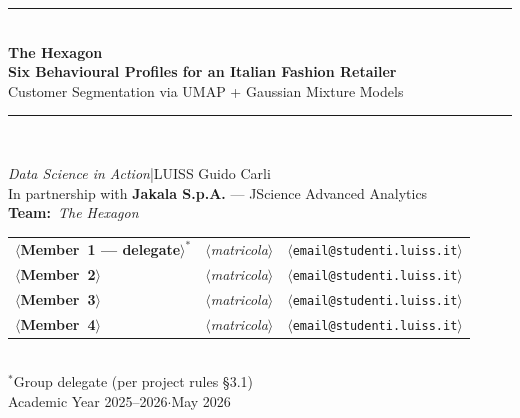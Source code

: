 \documentclass[10pt,a4paper]{article}
\begin{document}
\thispagestyle{empty}

\vspace*{0.8cm}
\begin{center}
{\color{navy}\rule{\linewidth}{2.5pt}}\\[0.7em]
{\LARGE\bfseries\color{navy}
  The Hexagon\\[0.2em]
  \large Six Behavioural Profiles for an Italian Fashion Retailer}\\[0.5em]
{\large\color{navy!70}
  Customer Segmentation via UMAP + Gaussian Mixture Models}\\[0.4em]
{\color{navy}\rule{\linewidth}{0.8pt}}\\[1.6em]

{\normalsize
  \textit{Data Science in Action}\quad|\quad LUISS Guido Carli\\[0.3em]
  In partnership with \textbf{Jakala S.p.A.} --- JScience Advanced Analytics\\[0.4em]
  \textbf{Team:}~\textit{The Hexagon}\\[1.2em]
  \begin{tabular}{lll}
    \textbf{$\langle$Member~1 --- delegate$\rangle^{*}$} & \textit{$\langle$matricola$\rangle$} & \texttt{$\langle$email@studenti.luiss.it$\rangle$} \\[2pt]
    \textbf{$\langle$Member~2$\rangle$} & \textit{$\langle$matricola$\rangle$} & \texttt{$\langle$email@studenti.luiss.it$\rangle$} \\[2pt]
    \textbf{$\langle$Member~3$\rangle$} & \textit{$\langle$matricola$\rangle$} & \texttt{$\langle$email@studenti.luiss.it$\rangle$} \\[2pt]
    \textbf{$\langle$Member~4$\rangle$} & \textit{$\langle$matricola$\rangle$} & \texttt{$\langle$email@studenti.luiss.it$\rangle$} \\
  \end{tabular}\\[0.4em]
  {\footnotesize $^{*}$Group delegate (per project rules \S3.1)}\\[1.4em]
  Academic Year 2025--2026\quad$\cdot$\quad May 2026
}\\[1.8em]


\end{center}
\end{document}
